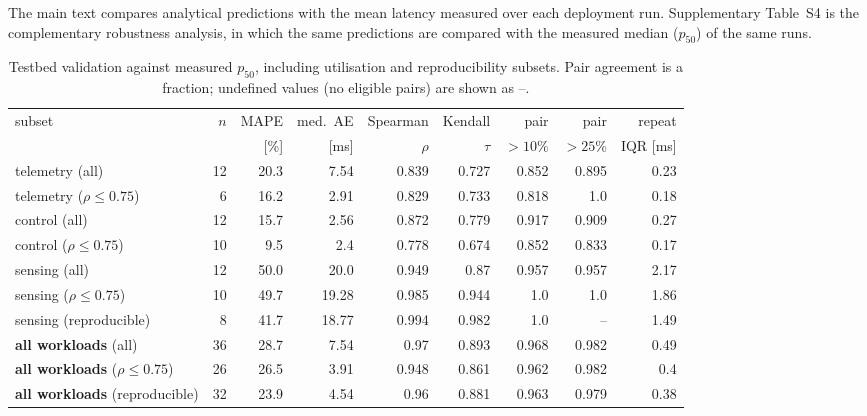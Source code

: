\documentclass[pdflatex,sn-nature]{sn-jnl}
\theoremstyle{thmstyleone}
\theoremstyle{thmstyletwo}
\theoremstyle{thmstylethree}
\begin{document}
The main text compares analytical predictions with the mean latency measured over each
deployment run. Supplementary Table~S4 is the complementary robustness analysis, in which
the same predictions are compared with the measured median ($p_{50}$) of the same runs.

\begin{table}[!htbp]\centering
\caption{Testbed validation against measured $p_{50}$, including utilisation and
reproducibility subsets. Pair agreement is a fraction; undefined values (no eligible
pairs) are shown as --.}\label{tabS4}
{\let\scriptsize\tiny\setlength{\tabcolsep}{2pt}\scriptsize
\setlength{\tabcolsep}{3pt}
\begin{tabular}{lrrrrrrrr}
\toprule
subset & $n$ & MAPE & med.\ AE & Spearman & Kendall & pair & pair & repeat \\
 & & [\%] & [ms] & $\rho$ & $\tau$ & $>10\%$ & $>25\%$ & IQR [ms] \\
\midrule
telemetry (all) & 12 & 20.3 & 7.54 & 0.839 & 0.727 & 0.852 & 0.895 & 0.23 \\
telemetry ($\rho\le0.75$) & 6 & 16.2 & 2.91 & 0.829 & 0.733 & 0.818 & 1.0 & 0.18 \\
control (all) & 12 & 15.7 & 2.56 & 0.872 & 0.779 & 0.917 & 0.909 & 0.27 \\
control ($\rho\le0.75$) & 10 & 9.5 & 2.4 & 0.778 & 0.674 & 0.852 & 0.833 & 0.17 \\
sensing (all) & 12 & 50.0 & 20.0 & 0.949 & 0.87 & 0.957 & 0.957 & 2.17 \\
sensing ($\rho\le0.75$) & 10 & 49.7 & 19.28 & 0.985 & 0.944 & 1.0 & 1.0 & 1.86 \\
sensing (reproducible) & 8 & 41.7 & 18.77 & 0.994 & 0.982 & 1.0 & -- & 1.49 \\
\textbf{all workloads} (all) & 36 & 28.7 & 7.54 & 0.97 & 0.893 & 0.968 & 0.982 & 0.49 \\
\textbf{all workloads} ($\rho\le0.75$) & 26 & 26.5 & 3.91 & 0.948 & 0.861 & 0.962 & 0.982 & 0.4 \\
\textbf{all workloads} (reproducible) & 32 & 23.9 & 4.54 & 0.96 & 0.881 & 0.963 & 0.979 & 0.38 \\
\bottomrule
\end{tabular}}
\end{table}
\end{document}
